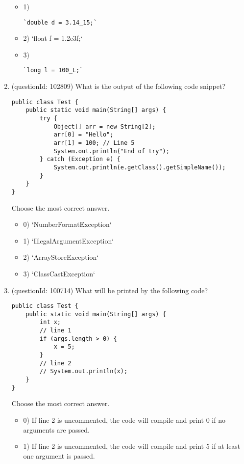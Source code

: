 \documentclass[12pt]{article}
\begin{document}
\begin{enumerate}[label=(\arabic*)]
\begin{itemize}
\item 1) \begin{verbatim}`double d = 3.14_15;`\end{verbatim}

\item 2) `float f = 1.2e3f;`

\item 3) \begin{verbatim}`long l = 100_L;`\end{verbatim}

\end{itemize}
\item (questionId: 102809) What is the output of the following code snippet?
\begin{verbatim}
public class Test {
    public static void main(String[] args) {
        try {
            Object[] arr = new String[2];
            arr[0] = "Hello";
            arr[1] = 100; // Line 5
            System.out.println("End of try");
        } catch (Exception e) {
            System.out.println(e.getClass().getSimpleName());
        }
    }
}
\end{verbatim}
Choose the most correct answer. 
\begin{itemize}
\item 0) `NumberFormatException`

\item 1) `IllegalArgumentException`

\item 2) `ArrayStoreException`

\item 3) `ClassCastException`

\end{itemize}
\item (questionId: 100714) What will be printed by the following code?\n\begin{verbatim}
public class Test {
    public static void main(String[] args) {
        int x;
        // line 1
        if (args.length > 0) {
            x = 5;
        } 
        // line 2
        // System.out.println(x);
    }
}
\end{verbatim}
Choose the most correct answer. 
\begin{itemize}
\item 0) If line 2 is uncommented, the code will compile and print 0 if no arguments are passed.

\item 1) If line 2 is uncommented, the code will compile and print 5 if at least one argument is passed.


\end{itemize}
\end{enumerate}
\end{document}

